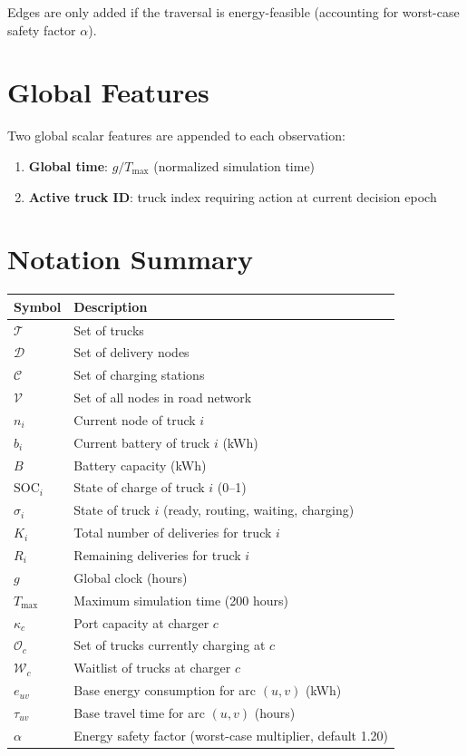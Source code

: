 \documentclass[11pt]{article}
\begin{document}
Edges are only added if the traversal is energy-feasible (accounting for worst-case safety factor $\alpha$).

\section{Global Features}

Two global scalar features are appended to each observation:

\begin{enumerate}[nosep]
    \item \textbf{Global time}: $g / T_{\max}$ (normalized simulation time)
    \item \textbf{Active truck ID}: truck index requiring action at current decision epoch
\end{enumerate}

\section{Notation Summary}

\begin{center}
\begin{tabular}{@{}ll@{}}
\toprule
\textbf{Symbol} & \textbf{Description} \\
\midrule
$\mathcal{T}$ & Set of trucks \\
$\mathcal{D}$ & Set of delivery nodes \\
$\mathcal{C}$ & Set of charging stations \\
$\mathcal{V}$ & Set of all nodes in road network \\
$n_i$ & Current node of truck $i$ \\
$b_i$ & Current battery of truck $i$ (kWh) \\
$B$ & Battery capacity (kWh) \\
$\text{SOC}_i$ & State of charge of truck $i$ (0--1) \\
$\sigma_i$ & State of truck $i$ (ready, routing, waiting, charging) \\
$K_i$ & Total number of deliveries for truck $i$ \\
$R_i$ & Remaining deliveries for truck $i$ \\
$g$ & Global clock (hours) \\
$T_{\max}$ & Maximum simulation time (200 hours) \\
$\kappa_c$ & Port capacity at charger $c$ \\
$\mathcal{O}_c$ & Set of trucks currently charging at $c$ \\
$\mathcal{W}_c$ & Waitlist of trucks at charger $c$ \\
$e_{uv}$ & Base energy consumption for arc $(u,v)$ (kWh) \\
$\tau_{uv}$ & Base travel time for arc $(u,v)$ (hours) \\
$\alpha$ & Energy safety factor (worst-case multiplier, default 1.20) \\
\bottomrule
\end{tabular}
\end{center}
\end{document}
